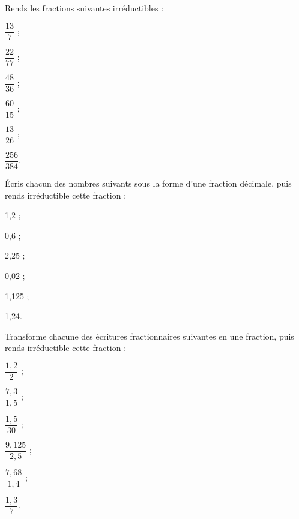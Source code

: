 \begin{exercice}
Rends les fractions suivantes irréductibles :
\vspace{0.5cm}
\begin{colenumerate}{3}
 \item $\dfrac{13}{7}$ ; 
 \vspace{0.2cm}
 \item $\dfrac{22}{77}$ ; 
 \item $\dfrac{48}{36}$ ; 
 \item $\dfrac{60}{15}$ ; 
 \item $\dfrac{13}{26}$ ; 
 \item $\dfrac{256}{384}$.
 \end{colenumerate}
\end{exercice}


\begin{exercice}
Écris chacun des nombres suivants sous la forme d'une fraction décimale, puis rends irréductible cette fraction :
\begin{colenumerate}{3}
 \item 1,2 ;
 \item 0,6 ;
 \item 2,25 ;
 \item 0,02 ;
 \item 1,125 ;
 \item 1,24.
 \end{colenumerate}
\end{exercice}

\newpage


\begin{exercice}
Transforme chacune des écritures fractionnaires suivantes en une fraction, puis rends irréductible cette fraction :
\vspace{0.3em}
\begin{colenumerate}{3}
 \item $\dfrac{1,2}{2}$ \dotfill; 
 \vspace{0.2cm}
 \item $\dfrac{7,3}{1,5}$ \dotfill; 
 \item $\dfrac{1,5}{30}$ \dotfill; 
 \item $\dfrac{9,125}{2,5}$ \dotfill; 
 \item $\dfrac{7,68}{1,4}$ \dotfill; 
 \item $\dfrac{1,3}{7}$\dotfill.
 \end{colenumerate}
\end{exercice}



